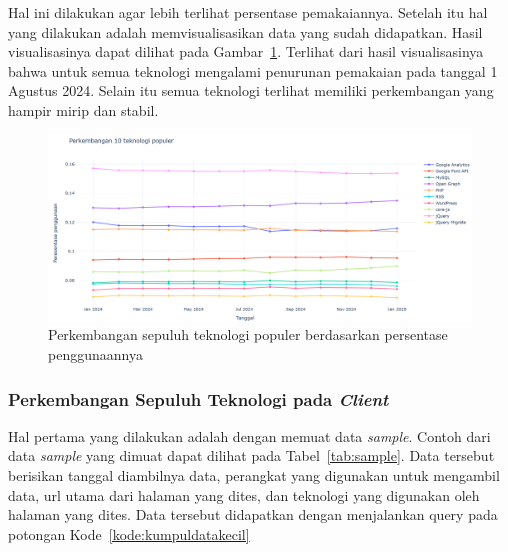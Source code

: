 Hal ini dilakukan agar lebih terlihat persentase pemakaiannya. Setelah itu hal yang dilakukan adalah memvisualisasikan data yang sudah didapatkan. Hasil visualisasinya dapat dilihat pada Gambar~\ref{fig:sample10}. Terlihat dari hasil visualisasinya bahwa untuk semua teknologi mengalami penurunan pemakaian pada tanggal 1 Agustus 2024. Selain itu semua teknologi terlihat memiliki perkembangan yang hampir mirip dan stabil.
\begin{figure}[H]
    \centering
    \includegraphics[width=0.7\linewidth]{Gambar/Perkembangan persentase.png}
    \caption{Perkembangan sepuluh teknologi populer berdasarkan persentase penggunaannya}
    \label{fig:sample10}
\end{figure}


\subsubsection{Perkembangan Sepuluh Teknologi pada \textit{Client} \mobile}
\label{subsub:10mobile}
Hal pertama yang dilakukan adalah dengan memuat data \textit{sample}. Contoh dari data \textit{sample} yang dimuat dapat dilihat pada Tabel~\ref{tab:sample}. Data tersebut berisikan tanggal diambilnya data, perangkat yang digunakan untuk mengambil data, url utama dari halaman \web yang dites, dan teknologi yang digunakan oleh halaman \web yang dites. Data tersebut didapatkan dengan menjalankan query pada potongan Kode~\ref{kode:kumpuldatakecil} 

